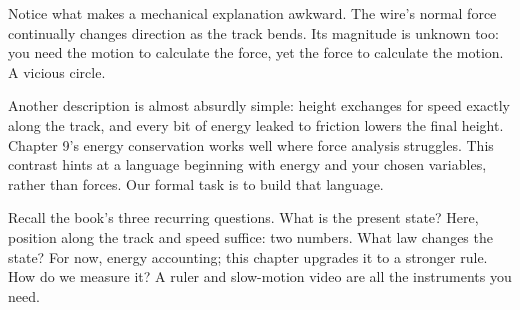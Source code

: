\begin{mainline}
Notice what makes a mechanical explanation awkward. The wire's normal force continually changes direction as the track bends. Its magnitude is unknown too: you need the motion to calculate the force, yet the force to calculate the motion. A vicious circle.

Another description is almost absurdly simple: height exchanges for speed exactly along the track, and every bit of energy leaked to friction lowers the final height. Chapter 9's energy conservation works well where force analysis struggles. This contrast hints at a language beginning with energy and your chosen variables, rather than forces. Our formal task is to build that language.

Recall the book's three recurring questions. What is the present state? Here, position along the track and speed suffice: two numbers. What law changes the state? For now, energy accounting; this chapter upgrades it to a stronger rule. How do we measure it? A ruler and slow-motion video are all the instruments you need.
\end{mainline}


